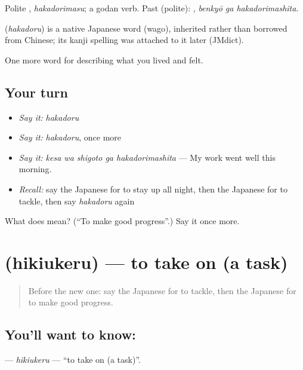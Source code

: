 Polite \textbf{}, \emph{hakadorimasu}; a godan verb. Past (polite): \textbf{ }, \emph{benkyō ga hakadorimashita}.

\begin{cousinweb}
\textbf{} (\emph{hakadoru}) is a native Japanese word (wago), inherited rather than borrowed from Chinese; its kanji spelling was attached to it later (JMdict).
\end{cousinweb}

\begin{grammarlens}[title={What you've built}]
One more word for describing what you lived and felt.
\end{grammarlens}

\subsection*{Your turn}
\begin{itemize}
\raggedright
  \item \emph{Say it:} \emph{hakadoru}
  \item \emph{Say it:} \emph{hakadoru}, once more
  \item \emph{Say it:} \emph{kesa wa shigoto ga hakadorimashita} — My work went well this morning.
  \item \emph{Recall:} say the Japanese for to stay up all night, then the Japanese for to tackle, then say \emph{hakadoru} again
\end{itemize}

\begin{tcolorbox}[breakable,colback=teal!4,colframe=teal!35!black,title={Before you move on}]
What does  mean? (\textquotedblleft{}To make good progress\textquotedblright{}.) Say it once more.
\end{tcolorbox}
\section[\texorpdfstring{\ja{ひきうける} (hikiukeru)}{ひきうける (hikiukeru)}]{ (hikiukeru) — to take on (a task)}

\label{lesson:JA-C454-hikiukeru}



\begin{quote}
Before the new one: say the Japanese for to tackle, then the Japanese for to make good progress.
\end{quote}

\subsection*{You'll want to know: }
\textbf{} — \emph{hikiukeru} — \textquotedblleft{}to take on (a task)\textquotedblright{}.

